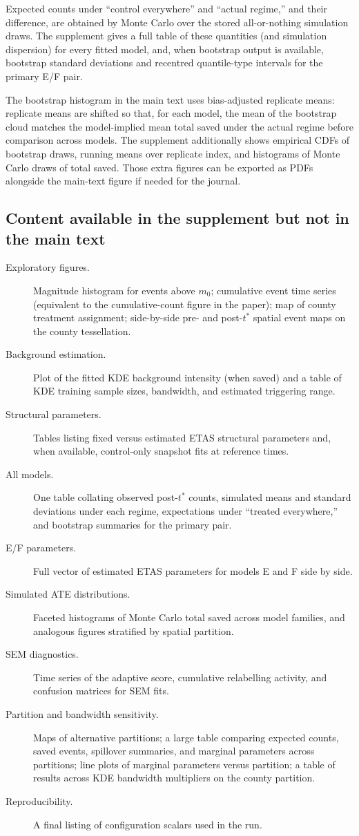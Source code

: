Expected counts under ``control everywhere'' and ``actual regime,'' and their difference, are obtained by Monte Carlo over the stored all-or-nothing simulation draws. The supplement gives a full table of these quantities (and simulation dispersion) for every fitted model, and, when bootstrap output is available, bootstrap standard deviations and recentred quantile-type intervals for the primary E/F pair.

The bootstrap histogram in the main text uses bias-adjusted replicate means: replicate means are shifted so that, for each model, the mean of the bootstrap cloud matches the model-implied mean total saved under the actual regime before comparison across models. The supplement additionally shows empirical CDFs of bootstrap draws, running means over replicate index, and histograms of Monte Carlo draws of total saved. Those extra figures can be exported as PDFs alongside the main-text figure if needed for the journal.

\subsection{Content available in the supplement but not in the main text}

\begin{description}
  \item[Exploratory figures.] Magnitude histogram for events above $m_0$; cumulative event time series (equivalent to the cumulative-count figure in the paper); map of county treatment assignment; side-by-side pre- and post-$t^*$ spatial event maps on the county tessellation.
  \item[Background estimation.] Plot of the fitted KDE background intensity (when saved) and a table of KDE training sample sizes, bandwidth, and estimated triggering range.
  \item[Structural parameters.] Tables listing fixed versus estimated ETAS structural parameters and, when available, control-only snapshot fits at reference times.
  \item[All models.] One table collating observed post-$t^*$ counts, simulated means and standard deviations under each regime, expectations under ``treated everywhere,'' and bootstrap summaries for the primary pair.
  \item[E/F parameters.] Full vector of estimated ETAS parameters for models E and F side by side.
  \item[Simulated ATE distributions.] Faceted histograms of Monte Carlo total saved across model families, and analogous figures stratified by spatial partition.
  \item[SEM diagnostics.] Time series of the adaptive score, cumulative relabelling activity, and confusion matrices for SEM fits.
  \item[Partition and bandwidth sensitivity.] Maps of alternative partitions; a large table comparing expected counts, saved events, spillover summaries, and marginal parameters across partitions; line plots of marginal parameters versus partition; a table of results across KDE bandwidth multipliers on the county partition.
  \item[Reproducibility.] A final listing of configuration scalars used in the run.
\end{description}
